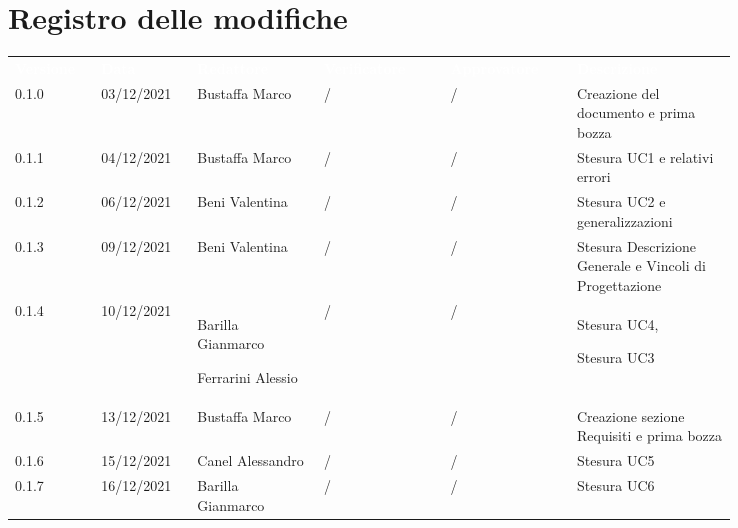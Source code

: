 \section*{Registro delle modifiche}

{\renewcommand{\arraystretch}{1.5}
\scriptsize
\begin{tabular}{p{0.10\linewidth}p{0.10\linewidth}p{0.15\linewidth}p{0.15\linewidth}p{0.15\linewidth}p{0.19\linewidth}}
	\rowcolor[RGB]{33, 73, 50}
	\textcolor{white}{\textbf{Versione}} & \textcolor{white}{\textbf{Data}} & 
	\textcolor{white}{\textbf{Redattore}} & \textcolor{white}{\textbf{Verificatore}} & 
	\textcolor{white}{\textbf{Approvatore}} & \textcolor{white}{\textbf{Descrizione}}\\
	\rowcolor[RGB]{216, 235, 171}
	0.1.0 & 03/12/2021 & Bustaffa Marco& / &/& Creazione del documento e prima bozza\\
	\rowcolor[RGB]{233, 245, 206}
	0.1.1 & 04/12/2021 & Bustaffa Marco& / &/& Stesura UC1 e relativi errori\\
	\rowcolor[RGB]{216, 235, 171}
	0.1.2 & 06/12/2021 & Beni Valentina& / &/& Stesura UC2 e generalizzazioni\\
	\rowcolor[RGB]{233, 245, 206}
	0.1.3 & 09/12/2021 & Beni Valentina& / &/& Stesura Descrizione Generale e Vincoli di Progettazione \\
	\rowcolor[RGB]{216, 235, 171}
	0.1.4 & 10/12/2021 & Barilla Gianmarco \par Ferrarini Alessio& / &/& Stesura UC4, \par Stesura UC3 \\
	\rowcolor[RGB]{233, 245, 206}
	0.1.5 & 13/12/2021 & Bustaffa Marco& / &/& Creazione sezione Requisiti e prima bozza\\
	\rowcolor[RGB]{216, 235, 171}
	0.1.6 & 15/12/2021 & Canel Alessandro& /&/& Stesura UC5\\
	\rowcolor[RGB]{233, 245, 206}
	0.1.7 & 16/12/2021 & Barilla Gianmarco& / &/& Stesura UC6\\
\end{tabular}	
}